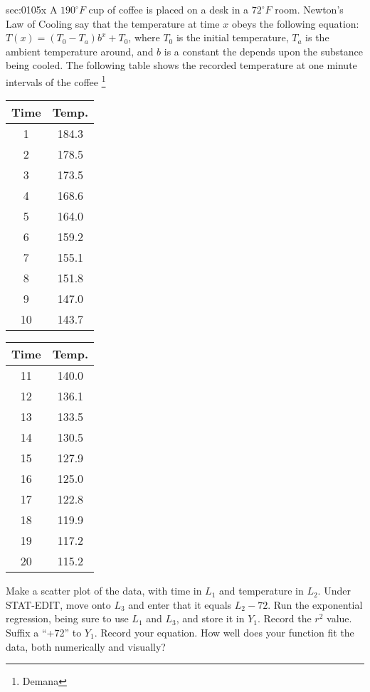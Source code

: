 \begin{multicols*}{2}
\begin{exercises}{sec:0105x}
\prob[0105newton] A $190^\circ F$ cup of coffee is placed on a desk in a $72^\circ F$ room.
Newton's Law of Cooling say that the temperature at time $x$ obeys the
following equation: $T(x) = (T_0-T_a)b^x+T_0$, where $T_0$ is the
initial temperature, $T_a$ is the ambient temperature around, and $b$ is 
a constant the depends upon the substance being cooled.  The following
table shows the recorded temperature at one minute intervals of the coffee
\footnote{Demana}
\begin{tabular}{c|c}
	\textbf{Time} & \textbf{Temp.} \\ \hline
	1 & 184.3 \\
	2 & 178.5 \\
	3 & 173.5 \\
	4 & 168.6 \\
	5 & 164.0 \\
	6 & 159.2 \\
	7 & 155.1 \\
	8 & 151.8\\
	9 & 147.0\\
	10 & 143.7\\
\end{tabular}
\begin{tabular}{c|c}
	\textbf{Time} & \textbf{Temp.} \\ \hline
	11 & 140.0\\
	12 & 136.1 \\
	13 & 133.5 \\
	14 & 130.5\\
	15 & 127.9 \\
	16 & 125.0\\
	17 & 122.8\\
	18 & 119.9\\
	19 & 117.2\\
	20 & 115.2\\
\end{tabular}


\subprob Make a scatter plot of the data, with time in $L_1$ and temperature
in $L_2$.
\subprob Under STAT-EDIT, move onto $L_3$ and enter that it equals $L_2-72$.  Run the exponential regression, being sure to use $L_1$ and $L_3$, and store it in $Y_1$.  Record the $r^2$ value.
\subprob Suffix a ``+72'' to $Y_1$.  Record your equation.  
\subprob How well does your function fit the data, both numerically and visually?

   
\end{exercises}
\end{multicols*}

